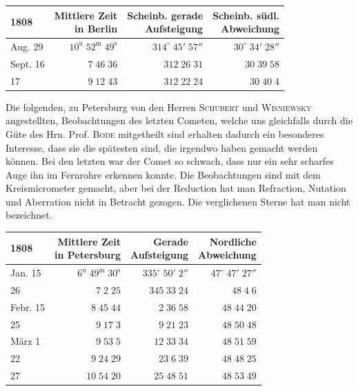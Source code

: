 \begin{center}\fontsize{10}{12}\selectfont\setlength{\tabcolsep}{5pt}\renewcommand{\arraystretch}{1.15}\begin{tabular}{lrrr}
1808 & \shortstack{Mittlere Zeit\\in Berlin} & \shortstack{Scheinb. gerade\\Aufsteigung} & \shortstack{Scheinb. südl.\\Abweichung}\\
\hline
Aug. 29 & $10^{\text{u}}\;52^{\text{m}}\;49^{\text{s}}$ & $314^\circ\;45'\;57''$ & $30^\circ\;34'\;28''$\\
Sept. 16 & $7\;46\;36$ & $312\;26\;31$ & $30\;39\;58$\\
17 & $9\;12\;43$ & $312\;22\;24$ & $30\;40\;4$\\
\end{tabular}\end{center}


\par\indent Die folgenden, zu Petersburg von den Herren \textsc{Schubert} und \textsc{Wisniewsky} angestellten, Beobachtungen des letzten Cometen, welche uns gleichfalls durch die Güte des Hrn. Prof. \textsc{Bode} mitgetheilt sind
erhalten dadurch ein besonderes Interesse, dass sie die spätesten sind, die irgendwo haben gemacht werden können. Bei den letzten war der Comet so schwach, dass nur ein sehr scharfes Auge ihn im Fernrohre erkennen konnte. Die Beobachtungen sind mit dem Kreismicrometer gemacht, aber bei der Reduction hat man Refraction, Nutation und Aberration nicht in Betracht gezogen. Die verglichenen
Sterne hat man nicht bezeichnet.


\begin{center}\fontsize{10}{12}\selectfont\setlength{\tabcolsep}{5pt}\renewcommand{\arraystretch}{1.15}\begin{tabular}{lrrr}
1808 & \shortstack{Mittlere Zeit\\in Petersburg} & \shortstack{Gerade\\Aufsteigung} & \shortstack{Nordliche\\Abweichung}\\
\hline
Jan. 15 & $6^{\text{u}}\;49^{\text{m}}\;30^{\text{s}}$ & $335^\circ\;50'\;2''$ & $47^\circ\;47'\;27''$\\
26 & $7\;2\;25$ & $345\;33\;24$ & $48\;4\;6$\\
Febr. 15 & $8\;45\;44$ & $2\;36\;58$ & $48\;44\;20$\\
25 & $9\;17\;3$ & $9\;21\;23$ & $48\;50\;48$\\
März 1 & $9\;53\;5$ & $12\;33\;34$ & $48\;51\;59$\\
22 & $9\;24\;29$ & $23\;6\;39$ & $48\;48\;25$\\
27 & $10\;54\;20$ & $25\;48\;51$ & $48\;53\;49$\\
\end{tabular}\end{center}



